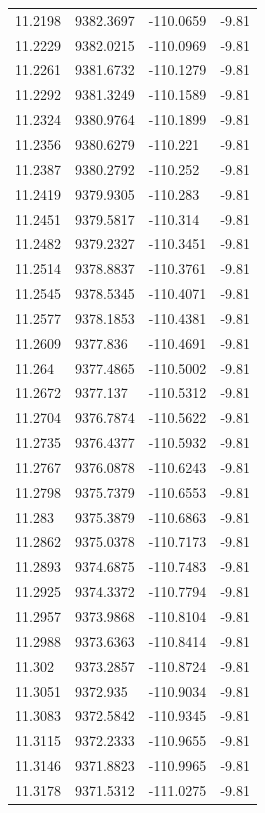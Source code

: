 \begin{table}[H]
\begin{tabular}{llll}
11.2198 & 9382.3697 & -110.0659 & -9.81 \\
11.2229 & 9382.0215 & -110.0969 & -9.81 \\
11.2261 & 9381.6732 & -110.1279 & -9.81 \\
11.2292 & 9381.3249 & -110.1589 & -9.81 \\
11.2324 & 9380.9764 & -110.1899 & -9.81 \\
11.2356 & 9380.6279 & -110.221 & -9.81 \\
11.2387 & 9380.2792 & -110.252 & -9.81 \\
11.2419 & 9379.9305 & -110.283 & -9.81 \\
11.2451 & 9379.5817 & -110.314 & -9.81 \\
11.2482 & 9379.2327 & -110.3451 & -9.81 \\
11.2514 & 9378.8837 & -110.3761 & -9.81 \\
11.2545 & 9378.5345 & -110.4071 & -9.81 \\
11.2577 & 9378.1853 & -110.4381 & -9.81 \\
11.2609 & 9377.836 & -110.4691 & -9.81 \\
11.264 & 9377.4865 & -110.5002 & -9.81 \\
11.2672 & 9377.137 & -110.5312 & -9.81 \\
11.2704 & 9376.7874 & -110.5622 & -9.81 \\
11.2735 & 9376.4377 & -110.5932 & -9.81 \\
11.2767 & 9376.0878 & -110.6243 & -9.81 \\
11.2798 & 9375.7379 & -110.6553 & -9.81 \\
11.283 & 9375.3879 & -110.6863 & -9.81 \\
11.2862 & 9375.0378 & -110.7173 & -9.81 \\
11.2893 & 9374.6875 & -110.7483 & -9.81 \\
11.2925 & 9374.3372 & -110.7794 & -9.81 \\
11.2957 & 9373.9868 & -110.8104 & -9.81 \\
11.2988 & 9373.6363 & -110.8414 & -9.81 \\
11.302 & 9373.2857 & -110.8724 & -9.81 \\
11.3051 & 9372.935 & -110.9034 & -9.81 \\
11.3083 & 9372.5842 & -110.9345 & -9.81 \\
11.3115 & 9372.2333 & -110.9655 & -9.81 \\
11.3146 & 9371.8823 & -110.9965 & -9.81 \\
11.3178 & 9371.5312 & -111.0275 & -9.81 \\

\end{tabular}
\end{table}
